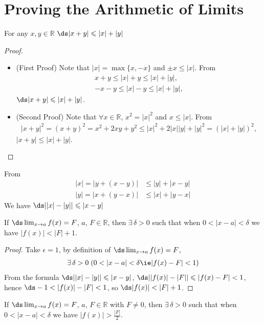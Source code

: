 \section{Proving the Arithmetic of Limits}
\begin{lemma}
  For any $x,y \in \mathbb{R}$ $\ds|x+y| \leqslant |x| + |y|$
\end{lemma}
\begin{proof}
  \begin{itemize}
    \item (First Proof) Note that $|x| = \max\{x, -x\}$ and $\pm x\leqslant |x|$. From
      \begin{align*}
        x + y \leqslant |x| + y \leqslant |x| + |y|, \\
        -x - y \leqslant |x| - y \leqslant |x| + |y|,
      \end{align*}
      $\ds |x + y|\leqslant |x| + |y|$.
    \item (Second Proof) Note that $\forall x\in\mathbb{R}$, $x^2 = |x|^2$ and $x \leqslant |x|$. From
      \begin{align*}
        |x + y|^2 = (x + y)^2 = x^2 + 2 x y + y^2 \leqslant |x|^2 + 2 |x||y| + |y|^2 = (|x| + |y|)^2,
      \end{align*}
      $|x + y|\leqslant |x| + |y|$.
  \end{itemize}
\end{proof}
From
\begin{align*}
  |x| = |y + (x - y)| &\leqslant |y| + |x - y| \\
  |y| = |x + (y - x)| &\leqslant |x| + |y - x|
\end{align*}
We have $\ds||x| - |y|| \leqslant |x - y|$
\begin{lemma}
  If $\ds \lim_{x \to a} f(x) = F$, $a$, $F\in\mathbb{R}$, then $\exists\,\delta > 0$ such that when $0 < |x - a| < \delta$ we have $|f(x)| < |F| + 1$.
\end{lemma}
\begin{proof}
  Take $\epsilon = 1$, by definition of $\ds \lim_{x \to a} f(x) = F$,
  \begin{align*}
    \exists\,\delta > 0\;(0 < |x - a| < \delta \ie  |f(x) - F| < 1)
  \end{align*}
  From the formula $\ds ||x| - |y|| \leqslant |x - y|$, $\ds ||f(x)| - |F|| \leqslant |f(x) - F| < 1$, hence $\ds-1 < |f(x)| - |F| < 1$, so $\ds |f(x)| < |F| + 1$.
\end{proof}
\begin{lemma}
  If $\ds \lim_{x \to a} f(x) = F$, $a$, $F\in\mathbb{R}$ with $F\ne 0$, then $\exists\,\delta >0$ such that when $0 < |x-a| < \delta$ we have $|f(x)|> \frac{|F|}{2}$.
\end{lemma}
